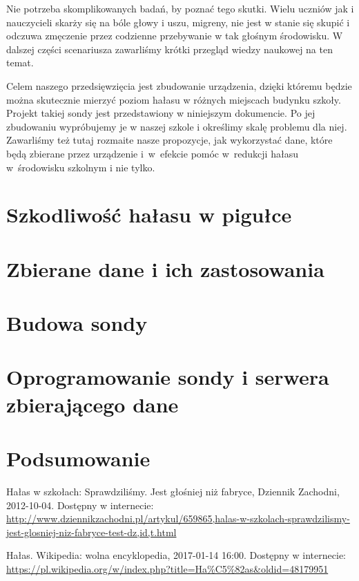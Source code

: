 \documentclass[12pt, a4paper]{article}
\begin{document}
Nie potrzeba skomplikowanych badań, by poznać tego skutki. Wielu uczniów jak i nauczycieli skarży się na bóle głowy i uszu, migreny, nie jest w stanie się skupić i odczuwa zmęczenie przez codzienne przebywanie w tak głośnym środowisku. W dalszej części scenariusza zawarliśmy krótki przegląd wiedzy naukowej na ten temat.

Celem naszego przedsięwzięcia jest zbudowanie urządzenia, dzięki któremu będzie można skutecznie mierzyć poziom hałasu w różnych miejscach budynku szkoły. Projekt takiej sondy jest przedstawiony w niniejszym dokumencie. Po jej zbudowaniu wypróbujemy je w naszej szkole i określimy skalę problemu dla niej. Zawarliśmy też tutaj rozmaite nasze propozycje, jak wykorzystać dane, które będą zbierane przez urządzenie i~w~efekcie pomóc w~redukcji hałasu w~środowisku szkolnym i nie tylko.

\section{Szkodliwość hałasu w pigułce}

\section{Zbierane dane i ich zastosowania}

\section{Budowa sondy}

\section{Oprogramowanie sondy i serwera zbierającego dane}

\section{Podsumowanie}

\begin{thebibliography}{9}

  Hałas w szkołach: Sprawdziliśmy. Jest głośniej niż fabryce, Dziennik Zachodni, 2012-10-04. Dostępny w internecie: \url{http://www.dziennikzachodni.pl/artykul/659865,halas-w-szkolach-sprawdzilismy-jest-glosniej-niz-fabryce-test-dz,id,t.html}

  Hałas. Wikipedia: wolna encyklopedia, 2017-01-14 16:00. Dostępny w internecie: \url{https://pl.wikipedia.org/w/index.php?title=Ha%C5%82as&oldid=48179951}
  
\end{thebibliography}
\end{document}
